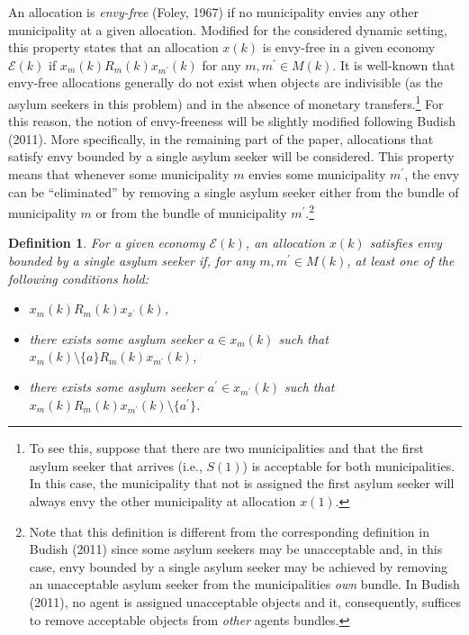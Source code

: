 \documentclass[12pt,fleqn]{article}
\newtheorem{definition}{Definition}
\begin{document}
An allocation is \emph{envy-free} (Foley, 1967) if no municipality envies any other municipality at a given allocation. Modified for the considered dynamic setting, this property states that an allocation $x(k)$ is envy-free in a given economy $\mathcal{E}(k)$ if $x_{m}(k)R_m(k) x_{m^\prime}(k)$ for any $m,m^\prime\in M(k)$. It is well-known that envy-free allocations generally do not exist when objects are indivisible (as the asylum seekers in this problem) and in the absence of monetary transfers.\footnote{To see this, suppose that there are two municipalities and that the first asylum seeker that arrives (i.e., $S(1)$) is acceptable for both municipalities. In this case, the municipality that not is assigned the first asylum seeker will always envy the other municipality at allocation $x(1)$.} For this reason, the notion of envy-freeness will be slightly modified following Budish (2011). More specifically, in the remaining part of the paper, allocations that satisfy envy bounded by a single asylum seeker will be considered. This property means that whenever some municipality $m$ envies some municipality $m^\prime$, the envy can be ``eliminated'' by removing a single asylum seeker either from the bundle of municipality $m$ or from the bundle of municipality $m^\prime$.\footnote{Note that this definition is different from the corresponding definition in Budish (2011) since some asylum seekers may be unacceptable and, in this case, envy bounded by a single asylum seeker may be achieved by removing an unacceptable asylum seeker from the municipalities \emph{own} bundle. In Budish (2011), no agent is assigned unacceptable objects and it, consequently, suffices to remove acceptable objects from \emph{other} agents bundles.}
\begin{definition}\rm\label{DEF:1-Utility_DIFF}
For a given economy $\mathcal{E}(k)$, an allocation $x(k)$ satisfies envy bounded by a single asylum seeker if, for any $m,m^\prime\in M(k)$, at least one of the following conditions hold:
\begin{itemize}
\item[(i)] $x_m(k)R_m(k) x_{x^\prime}(k)$,
\item[(ii)] there exists some asylum seeker $a\in x_{m}(k)$ such that $x_m(k)\setminus\{a\}R_m(k) x_{m^\prime}(k)$,
\item[(iii)] there exists some asylum seeker $a^\prime\in x_{m^\prime}(k)$ such that $x_m(k)R_m(k) x_{m^\prime}(k)\setminus\{a^\prime\}$.
\end{itemize}
\end{definition}
\end{document}
